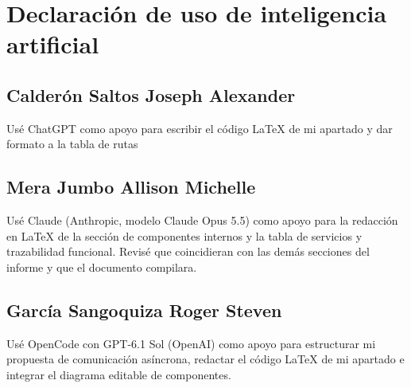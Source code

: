 \section{Declaración de uso de inteligencia artificial}

\subsection{Calderón Saltos Joseph Alexander}
Usé ChatGPT como apoyo para escribir el código LaTeX de mi apartado y 
dar formato a la tabla de rutas

\subsection{Mera Jumbo Allison Michelle}
Usé Claude (Anthropic, modelo Claude Opus 5.5) como apoyo
para la redacción en LaTeX de la sección de componentes internos y la tabla de
servicios y trazabilidad funcional. Revisé que coincidieran con las demás
secciones del informe y que el documento compilara.

\subsection{García Sangoquiza Roger Steven}
Usé OpenCode con GPT-6.1 Sol (OpenAI) como apoyo para estructurar
mi propuesta de comunicación asíncrona, redactar el código LaTeX
de mi apartado e integrar el diagrama editable de componentes.
